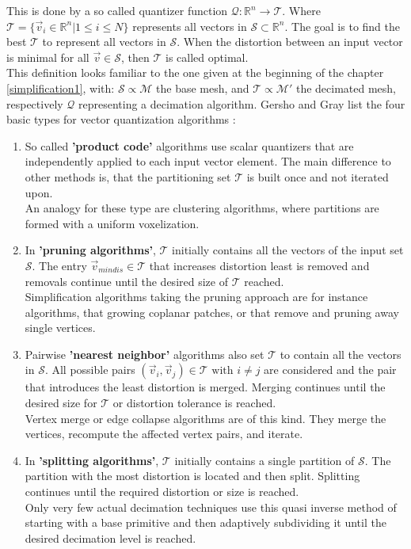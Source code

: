 This is done by a so called quantizer function $\mathcal{Q}: \mathbb{R}^{n} \rightarrow \mathcal{T}$.
Where $\mathcal{T} = \{\vec{v}_{i} \in \mathbb{R}^{n} | 1 \leq i \leq N\}$ represents all vectors in $\mathcal{S} \subset \mathbb{R}^{n}$.
The goal is to find the best $\mathcal{T}$ to represent all vectors in $\mathcal{S}$.
When the distortion between an input vector is minimal for all $\vec{v} \in \mathcal{S}$, then $\mathcal{T}$ is called optimal.\\
This definition looks familiar to the one given at the beginning of the chapter \ref{simplification1}, with: $\mathcal{S} \propto \mathcal{M}$ the base mesh, and $\mathcal{T} \propto \mathcal{M'}$ the decimated mesh, respectively $\mathcal{Q}$ representing a decimation algorithm.
Gersho and Gray list the four basic types for vector quantization algorithms \citep[][cf. pp.358 ff.]{Gersho1991}:
\begin{enumerate}
	\item So called \textbf{'product code'} algorithms use scalar quantizers that are independently applied to each input vector element.
	The main difference to other methods is, that the partitioning set $\mathcal{T}$ is built once and not iterated upon.\\
	An analogy for these type are clustering algorithms, where partitions are formed with a uniform voxelization.	
	\item  In \textbf{'pruning algorithms'}, $\mathcal{T}$ initially contains all the vectors of the input set $\mathcal{S}$. The entry $\vec{v}_{mindis} \in \mathcal{T}$ that increases distortion least is removed and removals continue until the desired size of $\mathcal{T}$ reached.\\
	Simplification algorithms taking the pruning approach are for instance algorithms, that growing coplanar patches, or that remove and pruning away single vertices.
	\item Pairwise \textbf{'nearest neighbor'} algorithms also set $\mathcal{T}$ to contain all the vectors in $\mathcal{S}$. All possible pairs $(\vec{v}_{i},\vec{v}_{j}) \in \mathcal{T} \text{ with } i\neq j$ are considered and the pair that introduces the least distortion is merged. Merging continues until the desired size for $\mathcal{T}$ or distortion tolerance is reached.\\
	Vertex merge or edge collapse algorithms are of this kind. They merge the vertices, recompute the affected vertex pairs, and iterate.
	\item In \textbf{'splitting algorithms'}, $\mathcal{T}$ initially contains a single partition of $\mathcal{S}$. The partition with the most distortion is located and then split. Splitting continues until the required distortion or size is reached.\\
	Only very few actual decimation techniques use this quasi inverse method of starting with a base primitive and then adaptively subdividing it until the desired decimation level is reached.
\end{enumerate}
